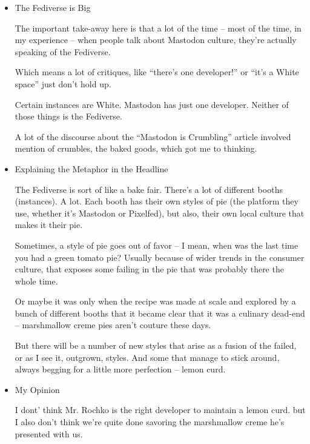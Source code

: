 \documentclass[11pt]{article}
\begin{document}
\begin{itemize}
\begin{itemize}
That’s federation. Mastodon is just one software that federates. There are others for microblogging, I know of Pleroma and glitch-soc, and Pixelfed for image-sharing. There’s Write Freely for long-form blogging.

For the sake of the headline, ActivityPub is the protocol these services use to federate – it’s how they communicate between each other, so they can make sense of the others’ data. Now, moving on.
\item The Fediverse is Big
\label{sec:orgcc8b047}

The important take-away here is that a lot of the time – most of the time, in my experience – when people talk about Mastodon culture, they’re actually speaking of the Fediverse.

Which means a lot of critiques, like “there’s one developer!” or “it’s a White space” just don’t hold up.

Certain instances are White. Mastodon has just one developer. Neither of those things is the Fediverse.

A lot of the discourse about the “Mastodon is Crumbling” article involved mention of crumbles, the baked goods, which got me to thinking.
\item Explaining the Metaphor in the Headline
\label{sec:org62b6778}

The Fediverse is sort of like a bake fair. There’s a lot of different booths (instances). A lot. Each booth has their own styles of pie (the platform they use, whether it’s Mastodon or Pixelfed), but also, their own local culture that makes it their pie.

Sometimes, a style of pie goes out of favor – I mean, when was the last time you had a green tomato pie? Usually because of wider trends in the consumer culture, that exposes some failing in the pie that was probably there the whole time.

Or maybe it was only when the recipe was made at scale and explored by a bunch of different booths that it became clear that it was a culinary dead-end – marshmallow creme pies aren’t couture these days.

But there will be a number of new styles that arise as a fusion of the failed, or as I see it, outgrown, styles. And some that manage to stick around, always begging for a little more perfection – lemon curd.
\item My Opinion
\label{sec:orgea01cfc}

I dont’ think Mr. Rochko is the right developer to maintain a lemon curd. but I also don’t think we’re quite done savoring the marshmallow creme he’s presented with us.


\end{itemize}
\end{itemize}
\end{document}
